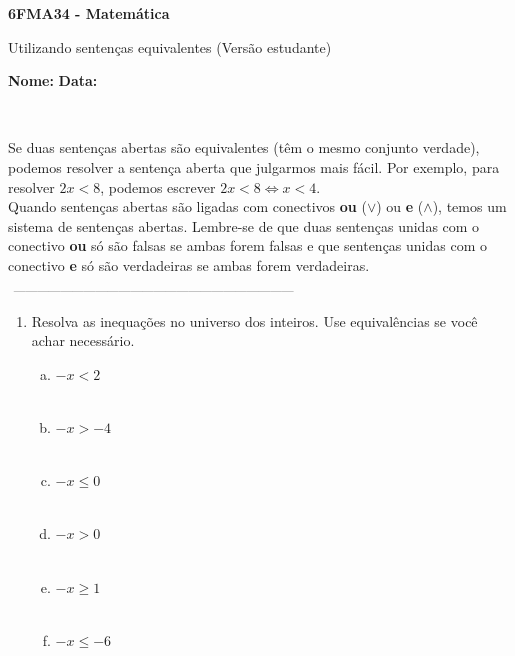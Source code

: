 \documentclass[a4paper,14pt]{article}
\begin{document}
	
	\noindent\textbf{6FMA34 - Matemática} 
	
	\begin{center}Utilizando sentenças equivalentes (Versão estudante)
	\end{center}
	
	\noindent\textbf{Nome:} \underline{\hspace{10cm}}
	\noindent\textbf{Data:} \underline{\hspace{4cm}}
	
	~ \\
    \begin{multicols}{2}
    	\noindent Se duas sentenças abertas são equivalentes (têm o mesmo conjunto verdade), podemos resolver a sentença aberta que julgarmos mais fácil. Por exemplo, para resolver $2x < 8$, podemos escrever $2x < 8 \Leftrightarrow x < 4$. \\
    	Quando sentenças abertas são ligadas com conectivos \textbf{ou} ($\lor$) ou \textbf{e} ($\land$), temos um sistema de sentenças abertas. Lembre-se de que duas sentenças unidas com o conectivo \textbf{ou} só são falsas se ambas forem falsas e que sentenças unidas com o conectivo \textbf{e} só são verdadeiras se ambas forem verdadeiras.
    	\noindent\textsubscript{~------------------------------------------------------------------------}
    	\begin{enumerate}
			\item Resolva as inequações no universo dos inteiros. Use equivalências se você achar necessário.
			\begin{enumerate}[a)]
				\item $-x < 2$ \\\\
				\item $-x > -4$ \\\\
				\item $-x \leq 0$ \\\\
				\item $-x > 0$ \\\\
				\item $-x \geq 1$ \\\\
				\item $-x \leq -6$ \\\\

\end{enumerate}
\end{enumerate}
\end{multicols}
\end{document}
